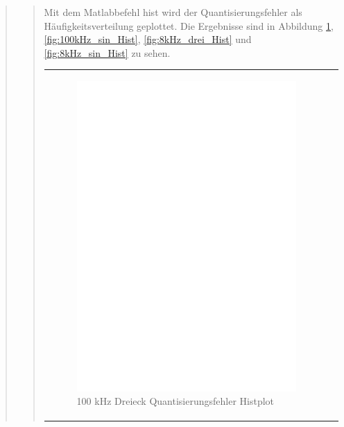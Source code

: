 \begin{quote}
\begin{quote}
        \vspace{2em} 
         
        Mit dem Matlabbefehl hist wird der Quantisierungsfehler als Häufigkeitsverteilung geplottet. Die Ergebnisse sind in
        Abbildung \ref{fig:100kHz_drei_Hist}, \ref{fig:100kHz_sin_Hist}, \ref{fig:8kHz_drei_Hist} und
        \ref{fig:8kHz_sin_Hist} zu sehen.
        
        \begin{center}
            \begin{tabular}{ll}
            
            \hspace{-4cm}
                \begin{minipage}{0.6\textwidth}
                    \begin{figure}[H]
                        \includegraphics[scale=0.5, trim = 16mm 70mm 16mm 85mm, clip]
                                        {Bilder/100kHz_dreieck_Quant_Hist}
                        \caption{100 kHz Dreieck Quantisierungsfehler Histplot}
                        \label{fig:100kHz_drei_Hist}
                    \end{figure}
                \end{minipage}
                

\end{tabular}
\end{center}
\end{quote}
\end{quote}
